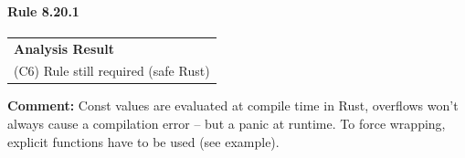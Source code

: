 \paragraph{Rule 8.20.1}
\begin{longtable}{p{13cm}}
\textbf{Analysis Result} \\
(C6) Rule still required (safe Rust) \\
\end{longtable}
\textbf{Comment:} Const values are evaluated at compile time in Rust, overflows won't always cause a compilation error – but a panic at runtime. To force wrapping, explicit functions have to be used (see example). \\


